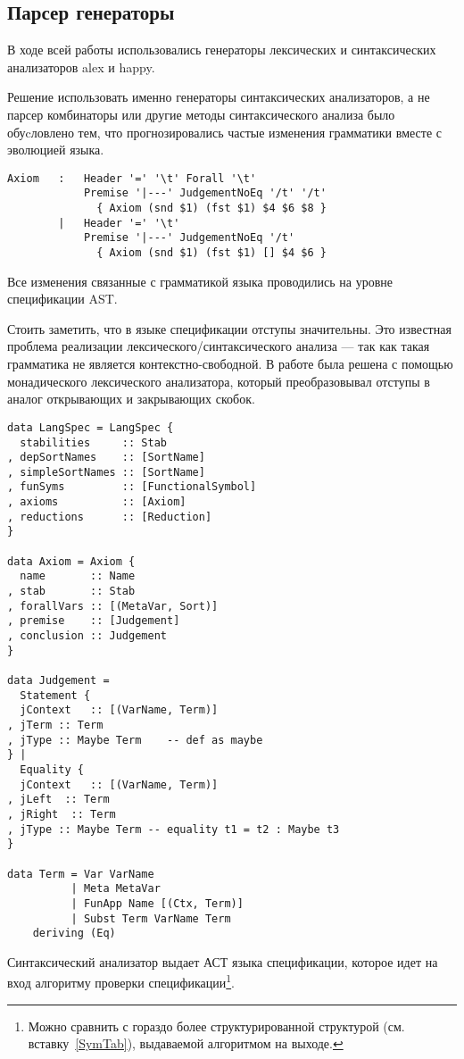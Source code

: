 \subsection{Парсер генераторы}
В ходе всей работы использовались генераторы лексических и синтаксических анализаторов alex\cite{alex} и happy\cite{happy}.

Решение использовать именно генераторы синтаксических анализаторов, а не парсер комбинаторы\cite{parsec} или другие методы синтаксического анализа было обуcловлено тем, что прогнозировались частые изменения грамматики вместе с эволюцией языка.


\begin{lstlisting}[caption={Часть спецификации синтаксического анализатора},captionpos=b, frame=single]
Axiom   :   Header '=' '\t' Forall '\t'
            Premise '|---' JudgementNoEq '/t' '/t'
              { Axiom (snd $1) (fst $1) $4 $6 $8 }
        |   Header '=' '\t'
            Premise '|---' JudgementNoEq '/t'
              { Axiom (snd $1) (fst $1) [] $4 $6 }
\end{lstlisting}


Все изменения связанные с грамматикой языка проводились на уровне спецификации AST.

\hfill

Стоить заметить, что в языке спецификации отступы значительны. Это известная проблема реализации лексического/синтаксического анализа --- так как такая грамматика не является контекстно-свободной. В работе была решена с помощью монадического лексического анализатора, который преобразовывал отступы в аналог открывающих и закрывающих скобок.

\begin{minipage}{\linewidth}
\begin{lstlisting}[caption={АСТ языка спецификации},captionpos=b,frame=single]
data LangSpec = LangSpec {
  stabilities     :: Stab
, depSortNames    :: [SortName]
, simpleSortNames :: [SortName]
, funSyms         :: [FunctionalSymbol]
, axioms          :: [Axiom]
, reductions      :: [Reduction]
}

data Axiom = Axiom {
  name       :: Name
, stab       :: Stab
, forallVars :: [(MetaVar, Sort)]
, premise    :: [Judgement]
, conclusion :: Judgement
}

data Judgement =
  Statement {
  jContext   :: [(VarName, Term)]
, jTerm :: Term
, jType :: Maybe Term    -- def as maybe
} |
  Equality {
  jContext   :: [(VarName, Term)]
, jLeft  :: Term
, jRight  :: Term
, jType :: Maybe Term -- equality t1 = t2 : Maybe t3
}

data Term = Var VarName
          | Meta MetaVar
          | FunApp Name [(Ctx, Term)]
          | Subst Term VarName Term
    deriving (Eq)
\end{lstlisting}
\end{minipage}

Синтаксический анализатор выдает АСТ языка спецификации, которое идет на вход алгоритму проверки спецификации\footnote{Можно сравнить с гораздо более структурированной структурой (см. вставку~\ref{SymTab}), выдаваемой алгоритмом на выходе.}.


